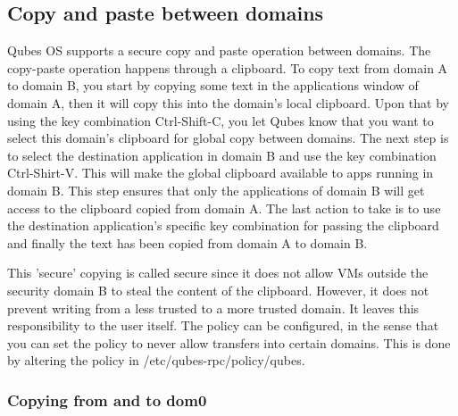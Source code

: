\documentclass[runningheads,a4paper]{article}
\begin{document}
\subsection{Copy and paste between domains} 

Qubes OS supports a secure
copy and paste operation between domains.  The copy-paste operation
happens through a clipboard.  To copy text from domain A to domain B,
you start by copying some text in the applications window of domain A, then
it will copy this into the domain's local clipboard.  Upon that by using
the key combination Ctrl-Shift-C, you let Qubes know that you want to
select this domain's clipboard for global copy between domains.  The
next step is to select the destination application in domain B and use
the key combination Ctrl-Shirt-V.  This will make the global clipboard
available to apps running in domain B.  This step ensures that only
the applications of domain B will get access to the clipboard copied
from domain A.  The last action to take is to use the destination
application's specific key combination for passing the clipboard and
finally the text has been copied from domain A to domain B.

This 'secure' copying is called secure since it does not allow VMs
outside the security domain B to steal the content of the clipboard.
However, it does not prevent writing from a less trusted to a more
trusted domain.  It leaves this responsibility to the user itself.
The policy can be configured, in the sense that you can set the policy
to never allow transfers into certain domains.  This is done by altering
the policy in /etc/qubes-rpc/policy/qubes. 

\subsubsection{Copying from and to dom0} 

\end{document}
